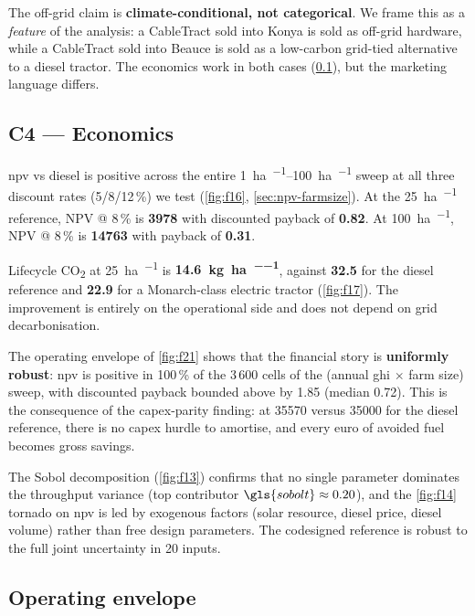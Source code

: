 \documentclass[11pt,a4paper]{article}
\begin{document}
The off-grid claim is \textbf{climate-conditional, not categorical}. We frame this as a \emph{feature} of the analysis: a CableTract sold into Konya is sold as off-grid hardware, while a CableTract sold into Beauce is sold as a low-carbon grid-tied alternative to a diesel tractor. The economics work in both cases (\cref{sec:r-c4}), but the marketing language differs.

\subsection{C4 --- Economics}\label{sec:r-c4}

\gls{npv} vs diesel is positive across the entire \SIrange{1}{100}{\hectare\per\year} sweep at all three discount rates (5/8/12\,\%) we test (\cref{fig:f16}, \cref{sec:npv-farmsize}). At the \SI{25}{\hectare\per\year} reference, NPV @ 8\,\% is \textbf{\SI{+3978}{\EUR}} with discounted payback of \textbf{\SI{0.82}{\year}}. At \SI{100}{\hectare\per\year}, NPV @ 8\,\% is \textbf{\SI{+14763}{\EUR}} with payback of \textbf{\SI{0.31}{\year}}.

Lifecycle CO\textsubscript{2} at \SI{25}{\hectare\per\year} is \textbf{\SI{14.6}{\kilogram\per\hectare\per\year}}, against \textbf{32.5} for the diesel reference and \textbf{22.9} for a Monarch-class electric tractor (\cref{fig:f17}). The improvement is entirely on the operational side and does not depend on grid decarbonisation.

The operating envelope of \cref{fig:f21} shows that the financial story is \textbf{uniformly robust}: \gls{npv} is positive in 100\,\% of the 3\,600 cells of the (annual \gls{ghi} $\times$ farm size) sweep, with discounted payback bounded above by \SI{1.85}{\year} (median \SI{0.72}{\year}). This is the consequence of the capex-parity finding: at \SI{35570}{\EUR} versus \SI{35000}{\EUR} for the diesel reference, there is no capex hurdle to amortise, and every euro of avoided fuel becomes gross savings.

The Sobol decomposition (\cref{fig:f13}) confirms that no single parameter dominates the throughput variance (top contributor $\gls{sobolt} \approx 0.20$), and the \cref{fig:f14} tornado on \gls{npv} is led by exogenous factors (solar resource, diesel price, diesel volume) rather than free design parameters. The codesigned reference is robust to the full joint uncertainty in 20 inputs.

\subsection{Operating envelope}\label{sec:r-envelope}
\end{document}
